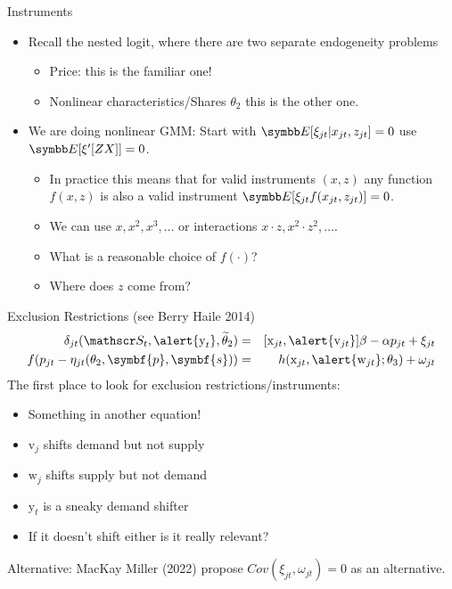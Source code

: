 \documentclass[aspectratio=169,10pt]{beamer}
\begin{document}
\begin{frame}{Instruments}
\begin{itemize}
\item Recall the nested logit, where there are two separate endogeneity problems
\begin{itemize}
\item \alert{Price}: this is the familiar one!
\item \alert{Nonlinear characteristics/Shares} $\theta_2$ this is the other one.
\end{itemize}
\item We are doing nonlinear GMM: Start with $\E[\xi_{jt} | x_{jt}, z_{jt}]=0$ use $\E[\xi' [Z X]]=0$.
\begin{itemize}
\item In practice this means that for valid instruments $(x,z)$ any function $f(x,z)$ is also a valid instrument $\E[ \xi_{jt} f(x_{jt},z_{jt})]=0$.
\item We can use $x, x^2, x^3,\ldots$ or interactions $x \cdot z, x^2 \cdot z^2, \ldots$.
\item What is a reasonable choice of $f(\cdot)$?
\item Where does $z$ come from?
\end{itemize}
\end{itemize}
\end{frame}



\begin{frame}{Exclusion Restrictions (see Berry Haile 2014)}
\begin{eqnarray*}
    \delta_{jt}(\calS_t,\alert{\textrm{y}_t}, \widetilde{\theta}_2) &=&  [\textrm{x}_{jt}, \alert{\textrm{v}_{jt}}]  \beta  - \alpha p_{jt} + \xi_{jt}\\
    f(p_{jt} - \eta_{jt}(\theta_2,\symbf{p},\symbf{s})) &=&   h(\textrm{x}_{jt},\alert{\textrm{w}_{jt}};\theta_3)+\omega_{jt}
\end{eqnarray*}
The first place to look for exclusion restrictions/instruments:
\begin{itemize}
\item Something in another equation!
\item $\textrm{v}_j$ shifts demand but not supply
\item $\textrm{w}_j$ shifts supply but not demand
\item $\textrm{y}_t$ is a sneaky demand shifter
\item If it doesn't shift either is it really relevant?
\end{itemize}
Alternative: MacKay Miller (2022) propose $Cov(\xi_{jt},  \omega_{jt})=0$ as an alternative.
\end{frame}
\end{document}
